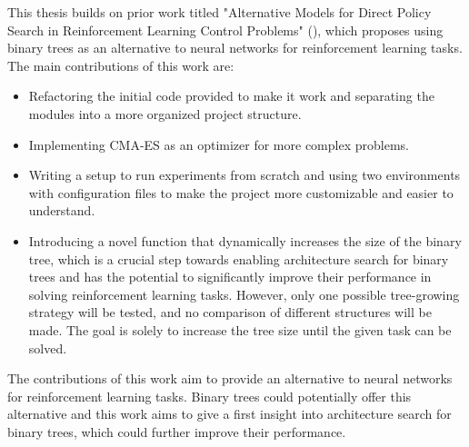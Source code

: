 This thesis builds on prior work titled "Alternative Models for Direct Policy Search in Reinforcement Learning Control Problems" (\cite{masanti_alternative_nodate}), which proposes using binary trees as an alternative to neural networks for reinforcement learning tasks. The main contributions of this work are:

\begin{itemize}
\item Refactoring the initial code provided to make it work and separating the modules into a more organized project structure.
\item Implementing CMA-ES as an optimizer for more complex problems.
\item Writing a setup to run experiments from scratch and using two environments with configuration files to make the project more customizable and easier to understand.
\item Introducing a novel function that dynamically increases the size of the binary tree, which is a crucial step towards enabling architecture search for binary trees and has the potential to significantly improve their performance in solving reinforcement learning tasks. However, only one possible tree-growing strategy will be tested, and no comparison of different structures will be made. The goal is solely to increase the tree size until the given task can be solved.
\end{itemize}

The contributions of this work aim to provide an alternative to neural networks for reinforcement learning tasks. Binary trees could potentially offer this alternative and this work aims to give a first insight into architecture search for binary trees, which could further improve their performance.